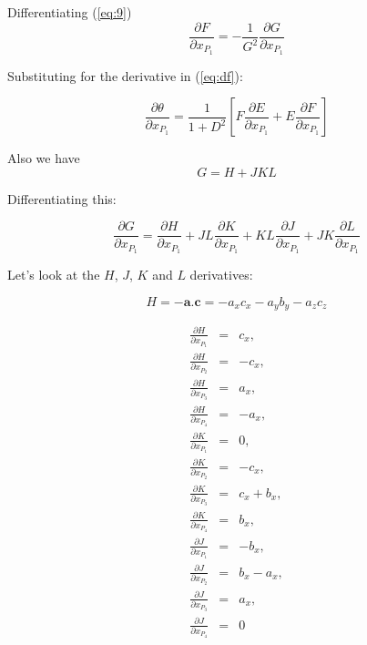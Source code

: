 Differentiating  (\ref{eq:9})
\begin{displaymath}
  \frac{\partial F}{\partial x_{P_1}} = -\frac{1}{G^2}\frac{\partial G}{\partial x_{P_1}}
\end{displaymath}

%

Substituting for the derivative in (\ref{eq:df}):

\begin{displaymath}
  \frac{\partial \theta}{\partial x_{P_1}} = \frac{1}{1+D^2}[F\frac{\partial E}{\partial x_{P_1}} + E\frac{\partial F}{\partial x_{P_1}}]
\end{displaymath}


Also we have
\begin{displaymath}
  G = H + JKL
\end{displaymath}

Differentiating this: 

\begin{displaymath}
  \frac{\partial G}{\partial x_{P_1}} = \frac{\partial H}{\partial x_{P_1}} + JL\frac{\partial K}{\partial x_{P_1}} + KL\frac{\partial J}{\partial x_{P_1}} + JK\frac{\partial L}{\partial x_{P_1}}
\end{displaymath}

Let's look at the $H$, $J$, $K$ and $L$ derivatives:

\begin{displaymath}
    H = -\mathbf{a}.\mathbf{c} = -a_x c_x - a_y b_y - a_z c_z
\end{displaymath}

\begin{eqnarray*}
  \frac{\partial H}{\partial x_{P_1}} & = & c_x,\\
  \frac{\partial H}{\partial x_{P_2}} & = & -c_x,\\
  \frac{\partial H}{\partial x_{P_3}} & = & a_x,\\
  \frac{\partial H}{\partial x_{P_4}} & = & -a_x,\\
  \frac{\partial K}{\partial x_{P_1}} & = & 0,\\
  \frac{\partial K}{\partial x_{P_2}} & = & -c_x,\\
  \frac{\partial K}{\partial x_{P_3}} & = & c_x + b_x,\\
  \frac{\partial K}{\partial x_{P_4}} & = & b_x,\\
  \frac{\partial J}{\partial x_{P_1}} & = & -b_x,\\
  \frac{\partial J}{\partial x_{P_2}} & = & b_x - a_x,\\
  \frac{\partial J}{\partial x_{P_3}} & = & a_x,\\
  \frac{\partial J}{\partial x_{P_4}} & = & 0
\end{eqnarray*}

